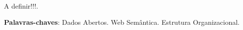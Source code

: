 \begin{resumo}

A definir!!!.
 \vspace{\onelineskip}
    
 \noindent
 \textbf{Palavras-chaves}: Dados Abertos. Web Semântica. Estrutura Organizacional. 
\end{resumo}

